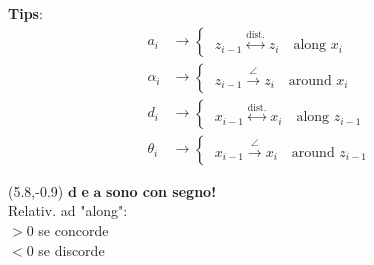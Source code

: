 \vspace*{10pt}
\textbf{Tips}:
\begin{align*}
a_i &\rightarrow
\begin{cases}
\ z_{i-1} \overset{\text{dist.}}{\longleftrightarrow} z_i \quad \text{along } x_i
\end{cases}\\
%
\alpha_i &\rightarrow
\begin{cases}
\ z_{i-1} \overset{\angle}{\longrightarrow} z_i \quad \text{around } x_i
\end{cases}\\
%
d_i &\rightarrow
\begin{cases}
\ x_{i-1} \overset{\text{dist.}}{\longleftrightarrow} x_i \quad \text{along } z_{i-1}
\end{cases}\\
%
\theta_i &\rightarrow
\begin{cases}
\ x_{i-1} \overset{\angle}{\longrightarrow} x_i \quad \text{around } z_{i-1}
\end{cases}
\end{align*}

\begin{textblock}{5}(5.8,-0.9)
	\small
	$\bm{d}$ \textbf{e} $\bm{a}$ \textbf{sono con segno!}\\
	Relativ. ad "along":\\[5pt]
	$> 0$ se concorde \\
	$< 0$ se discorde
\end{textblock}
	
\vspace*{-15pt}
